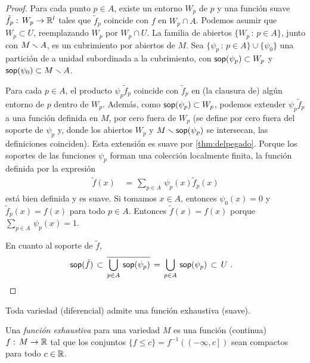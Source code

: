 \begin{proof}
	Para cada punto $p\in A$, existe un entorno $W_{p}$ de $p$
	y una funci\'{o}n suave $\tilde{f}_{p}:\,W_{p}\rightarrow\mathbb{R}^{l}$
	tales que $\tilde{f}_{p}$ coincide con $f$ en $W_{p}\cap A$. Podemos
	asumir que $W_{p}\subset U$, reemplazando $W_{p}$ por $W_{p}\cap U$.
	La familia de abiertos $\{W_{p}\,:\,p\in A\}$, junto con $M\smallsetminus A$,
	es un cubrimiento por abiertos de $M$. Sea
	$\{\psi_{p}\,:\,p\in A\}\cup\{\psi_{0}\}$ una partici\'{o}n de a
	unidad subordinada a la cubrimiento, con $\soporte{\psi_{p}}%
	\subset W_{p}$ y $\mathsf{sop}(\psi_{0})\subset M\smallsetminus A$.

	Para cada $p\in A$, el producto $\psi_{p}\tilde{f}_{p}$ coincide
	con $\tilde{f}_{p}$ en (la clausura de) alg\'{u}n entorno de $p$
	dentro de $W_{p}$. Adem\'{a}s, como $\mathsf{sop}(\psi_{p})\subset W_{p}$,
	podemos extender $\psi_{p}\tilde{f}_{p}$ a una funci\'{o}n
	definida en $M$, por cero fuera de $W_{p}$ (se define por cero
	fuera del soporte de $\psi_{p}$ y, donde los abiertos $W_{p}$ y
	$M\smallsetminus\mathsf{sop}(\psi_{p})$ se intersecan, las definiciones
	coinciden). Esta extensi\'{o}n es suave por \ref{thm:delpegado}.
	Porque los soportes de las funciones $\psi_{p}$ forman una
	colecci\'{o}n localmente finita, la funci\'{o}n definida por la
	expresi\'{o}n
	\begin{align*}
		\tilde{f}(x) & \,=\,\sum_{p\in A}\,\psi_{p}(x)\tilde{f}_{p}(x)
	\end{align*}
	est\'{a} bien definida y es suave. Si tomamos $x\in A$, entonces
	$\psi_{0}(x)=0$ y $\tilde{f}_{p}(x)=f(x)$ para todo $p\in A$.
	Entonces $\tilde{f}(x)=f(x)$ porque $\sum_{p\in A}\,\psi_{p}(x)=1$.

	En cuanto al soporte de $\tilde{f}$,
	\begin{align*}
		\mathsf{sop}(\tilde{f}) & \,\subset\,
			\overline{\bigcup_{p\in A}\,\mathsf{sop}(\psi_{p})}
			\,=\,\bigcup_{p\in A}\,\mathsf{sop}(\psi_{p})
			\,\subset\, U
		\text{ .}
	\end{align*}
\end{proof}

\begin{coroExhaustiva}\label{thm:exhaustiva}
	Toda variedad (diferencial) admite una funci\'{o}n exhaustiva (suave).
\end{coroExhaustiva}

Una \emph{funci\'{o}n exhaustiva} para una variedad $M$ es una funci\'{o}n
(continua) $f:\,M\rightarrow\mathbb{R}$ tal que los conjuntos
$\{f\leq c\}=f^{-1}(\left(-\infty,c\right])$ sean compactos para todo
$c\in\mathbb{R}$.

